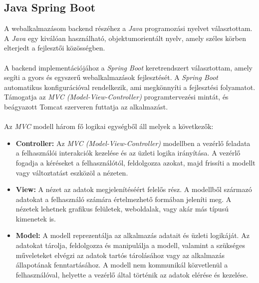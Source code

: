 \subsection{\textbf{Java Spring Boot}}

A webalkalmazásom backend részéhez a \textit{Java} \cite{java} programozási nyelvet választottam. A \textit{Java} egy kiválóan használható, objektumorientált nyelv, amely széles körben elterjedt a fejlesztői közösségben.\\
\\
A backend implementációjához a \textit{Spring Boot} \cite{spring_boot} keretrendszert választottam, amely segíti a gyors és egyszerű webalkalmazások fejlesztését. A \textit{Spring Boot} automatikus konfigurációval rendelkezik, ami megkönnyíti a fejlesztési folyamatot. Támogatja az \textit{MVC (Model-View-Controller)} \cite{mvc} programtervezési mintát, és beágyazott Tomcat szerveren futtatja az alkalmazást.\\ 
\\
Az \textit{MVC} modell három fő logikai egységből áll melyek a következők:

\begin{itemize}
\item \textbf{Controller:} Az \textit{MVC (Model-View-Controller)} modellben a vezérlő feladata a felhasználói interakciók kezelése és az üzleti logika irányítása. A vezérlő fogadja a kéréseket a felhasználótól, feldolgozza azokat, majd frissíti a modellt vagy változtatást eszközöl a nézeten.
\item \textbf{View:} A nézet az adatok megjelenítéséért felelős rész. A modellből származó adatokat a felhasználó számára értelmezhető formában jeleníti meg. A nézetek lehetnek grafikus felületek, weboldalak, vagy akár más típusú kimenetek is.
\item \textbf{Model:} A modell reprezentálja az alkalmazás adatait és üzleti logikáját. Az adatokat tárolja, feldolgozza és manipulálja a modell, valamint a szükséges műveleteket elvégzi az adatok tartós tárolásához vagy az alkalmazás állapotának fenntartásához. A modell nem kommunikál közvetlenül a felhasználóval, helyette a vezérlő által történik az adatok elérése és kezelése.
\end{itemize}

